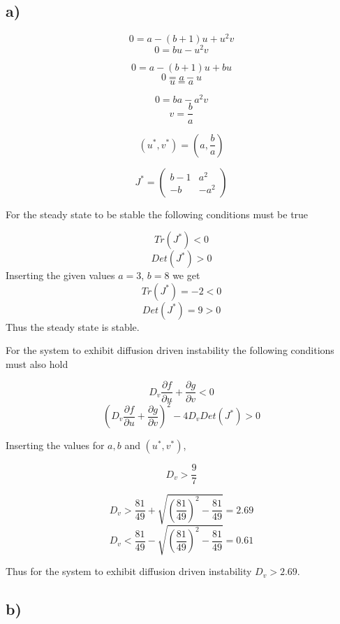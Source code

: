 \subsection{a)}

$$0 = a - (b+1)u + u^2v$$
$$0 = bu - u^2v$$

$$0 = a-(b+1)u +bu$$
$$0 = a - u$$
$$u = a$$

$$0 = ba - a^2v$$
$$v = \frac{b}{a}$$

$$(u^*, v^*)=\left(a,\frac{b}{a}\right)$$

$$J^* = \left(
\begin{array}{cc}
    b-1 & a^2 \\
    -b  & -a^2
\end{array}
\right)$$

For the steady state to be stable the following conditions must be true

$$Tr(J^*) < 0$$
$$Det(J^*) > 0$$
Inserting the given values $a=3$, $b=8$ we get
$$Tr(J^*) = -2 < 0$$
$$Det(J^*) = 9 > 0$$
Thus the steady state is stable.

For the system to exhibit diffusion driven instability the following conditions must also hold

$$D_v \frac{\partial f}{\partial u} + \frac{\partial g}{\partial v} < 0$$
$$(D_v \frac{\partial f}{\partial u}+ \frac{\partial g}{\partial v})^2 - 4D_v Det(J^*) > 0$$

Inserting the values for $a, b$ and $(u^*, v^*)$,

$$D_v > \frac{9}{7}$$

$$D_v > \frac{81}{49} + \sqrt{\left(\frac{81}{49}\right)^2 - \frac{81}{49}} = 2.69$$
$$D_v < \frac{81}{49} - \sqrt{\left(\frac{81}{49}\right)^2 - \frac{81}{49}} = 0.61$$

Thus for the system to exhibit diffusion driven instability $D_v > 2.69$.


\subsection{b)}

